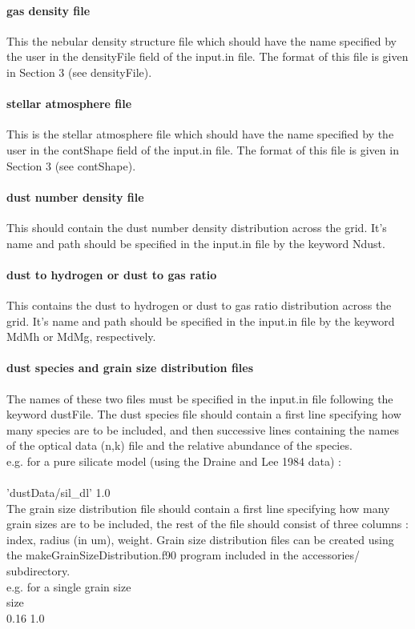 \documentclass[11pt]{article}
\begin{document}
\paragraph{     gas density file}
    This the nebular density structure file which should have the name specified by
    the user in the densityFile field of the input.in file. The format of this file
    is given in Section 3 (see densityFile). 

\paragraph{     stellar atmosphere file}
    This is the stellar atmosphere file which should have the name specified by
    the user in the contShape field of the input.in file. The format of this file 
    is given in Section 3 (see contShape). 

\paragraph{     dust number density file}
    This should contain the dust number density distribution across the grid. 
    It's name and path should be specified in the input.in file by the keyword 
    Ndust. 

\paragraph{     dust to hydrogen or dust to gas ratio}
    This contains the dust to hydrogen or dust to gas ratio distribution across 
    the grid. It's name and path should be specified in the input.in file by the keyword 
    MdMh or MdMg, respectively. 

\paragraph{     dust species and grain size distribution files }
    The names of these two files must be specified in the input.in file following
    the keyword dustFile. 
    The dust species file should contain a first line specifying how many species are 
    to be included, and then successive lines containing the names of the optical data (n,k) 
    file and the relative abundance of the species. \\
\noindent    e.g. for a pure silicate model (using the Draine and Lee 1984 data) :\\
\\
\noindent       'dustData/sil\_dl' 1.0\\
    The grain size distribution file should contain a first 
    line specifying how many grain sizes are to be included, the rest of the file
    should consist of three columns : index, radius (in um), weight. Grain size 
    distribution files can be created using the makeGrainSizeDistribution.f90 
    program included in the accessories/ subdirectory. \\
\noindent e.g. for a single grain size \\
 size\\
 0.16 1.0\\
\end{document}
